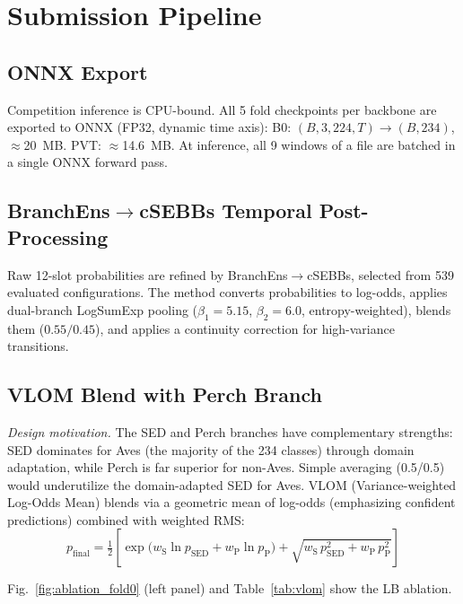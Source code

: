 \documentclass[journal]{IEEEtran}
\begin{document}
\section{Submission Pipeline}

\subsection{ONNX Export}

Competition inference is CPU-bound. All 5 fold checkpoints per backbone are exported to ONNX (FP32, dynamic time axis):
B0: $(B,3,224,T)\!\to\!(B,234)$, $\approx$20~MB. PVT: $\approx$14.6~MB.
At inference, all 9 windows of a file are batched in a single ONNX forward pass.

\subsection{BranchEns$\to$cSEBBs Temporal Post-Processing}

Raw 12-slot probabilities are refined by BranchEns$\to$cSEBBs, selected from 539 evaluated configurations. The method converts probabilities to log-odds, applies dual-branch LogSumExp pooling ($\beta_1=5.15$, $\beta_2=6.0$, entropy-weighted), blends them ($0.55/0.45$), and applies a continuity correction for high-variance transitions.

\subsection{VLOM Blend with Perch Branch}

\emph{Design motivation.}
The SED and Perch branches have complementary strengths: SED dominates for Aves (the majority of the 234 classes) through domain adaptation, while Perch is far superior for non-Aves.
Simple averaging (0.5/0.5) would underutilize the domain-adapted SED for Aves.
VLOM (Variance-weighted Log-Odds Mean) blends via a geometric mean of log-odds (emphasizing confident predictions) combined with weighted RMS:
\begin{equation}
  p_\text{final} = \tfrac{1}{2}\!\left[\exp\!\bigl(w_\text{S}\ln p_\text{SED} + w_\text{P}\ln p_\text{P}\bigr) + \sqrt{w_\text{S}\,p_\text{SED}^2 + w_\text{P}\,p_\text{P}^2}\right]
\end{equation}

Fig.~\ref{fig:ablation_fold0} (left panel) and Table~\ref{tab:vlom} show the LB ablation.
\end{document}

